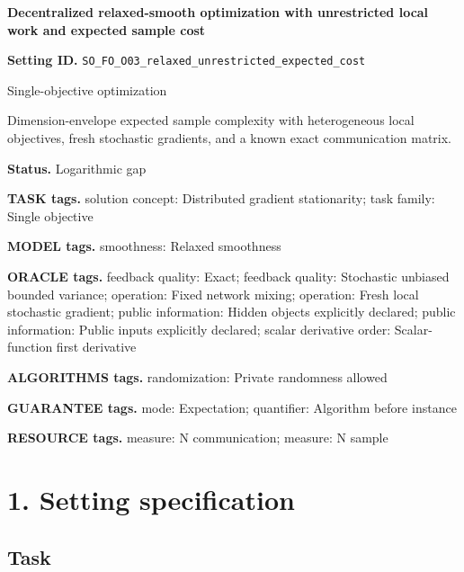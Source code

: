 \documentclass[10pt,a4paper]{article}
\begin{document}
\raggedright

{\LARGE\bfseries\sffamily\color{AtlasNavy} Decentralized relaxed-smooth optimization with unrestricted local work and expected sample cost\par}\vspace{5pt}


\textbf{Setting ID.} \texttt{SO\_\allowbreak{}FO\_\allowbreak{}O03\_\allowbreak{}relaxed\_\allowbreak{}unrestricted\_\allowbreak{}expected\_\allowbreak{}cost}



Single-objective optimization



Dimension-envelope expected sample complexity with heterogeneous local objectives, fresh stochastic gradients, and a known exact communication matrix.



\textbf{Status.} Logarithmic gap



\textbf{TASK tags.} solution concept: Distributed gradient stationarity; task family: Single objective



\textbf{MODEL tags.} smoothness: Relaxed smoothness



\textbf{ORACLE tags.} feedback quality: Exact; feedback quality: Stochastic unbiased bounded variance; operation: Fixed network mixing; operation: Fresh local stochastic gradient; public information: Hidden objects explicitly declared; public information: Public inputs explicitly declared; scalar derivative order: Scalar-function first derivative



\textbf{ALGORITHMS tags.} randomization: Private randomness allowed



\textbf{GUARANTEE tags.} mode: Expectation; quantifier: Algorithm before instance



\textbf{RESOURCE tags.} measure: N communication; measure: N sample



\section{1. Setting specification}


\subsection{Task}
\end{document}
